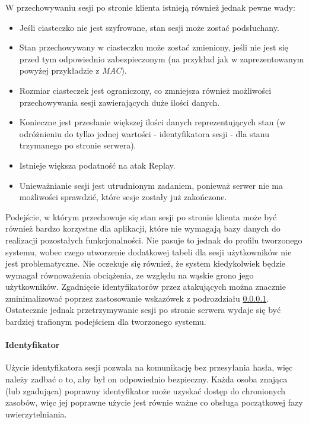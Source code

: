 \documentclass[11pt]{aghdpl}
\begin{document}
W przechowywaniu sesji po stronie klienta istnieją również jednak pewne wady:
\begin{itemize}
	\item Jeśli ciasteczko nie jest szyfrowane, stan sesji może zostać podsłuchany.
	\item Stan przechowywany w ciasteczku może zostać zmieniony, jeśli nie jest się przed tym odpowiednio zabezpieczonym (na przykład jak w zaprezentowanym powyżej przykładzie z \emph{MAC}).
	\item Rozmiar ciasteczek jest ograniczony, co zmniejsza również możliwości przechowywania sesji zawierających duże ilości danych.
	\item Konieczne jest przesłanie większej ilości danych reprezentujących stan (w odróżnieniu do tylko jednej wartości - identyfikatora sesji - dla stanu trzymanego po stronie serwera).
	\item Istnieje większa podatność na atak Replay.
	\item Unieważnianie sesji jest utrudnionym zadaniem, ponieważ serwer nie ma możliwości sprawdzić, które sesje zostały już zakończone.
\end{itemize}

Podejście, w którym przechowuje się stan sesji po stronie klienta może być również bardzo korzystne dla aplikacji, które nie wymagają bazy danych do realizacji pozostałych funkcjonalności. Nie pasuje to jednak do profilu tworzonego systemu, wobec czego utworzenie dodatkowej tabeli dla sesji użytkowników nie jest problematyczne. Nie oczekuje się również, że system kiedykolwiek będzie wymagał równoważenia obciążenia, ze względu na wąskie grono jego użytkowników. Zgadnięcie identyfikatorów przez atakujących można znacznie zminimalizować poprzez zastosowanie wskazówek z podrozdziału \ref{sec:identyfikator}. Ostatecznie jednak przetrzymywanie sesji po stronie serwera wydaje się być bardziej trafionym podejściem dla tworzonego systemu.


\paragraph{Identyfikator}
\label{sec:identyfikator}

Użycie identyfikatora sesji pozwala na komunikację bez przesyłania hasła, więc należy zadbać o to, aby był on odpowiednio bezpieczny. Każda osoba znająca (lub zgadująca) poprawny identyfikator może uzyskać dostęp do chronionych zasobów, więc jej poprawne użycie jest równie ważne co obsługa początkowej fazy uwierzytelniania.
\end{document}
